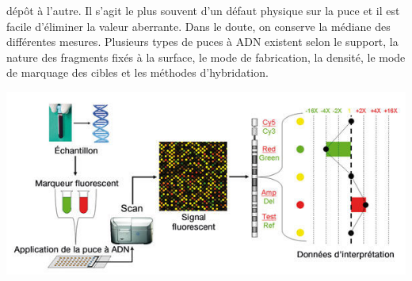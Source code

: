 \documentclass[a4paper,10pt]{article}
\begin{document}
  dépôt à l'autre. Il s'agit le plus souvent d'un défaut physique sur la puce et il est facile d'éliminer la valeur aberrante.
  Dans le doute, on conserve la médiane des différentes mesures. 
  \newline
  Plusieurs  types  de  puces  à  ADN  
existent selon le support, la nature des fragments fixés à la surface, le mode de fabrication, la 
densité, le mode de marquage des cibles et les méthodes d’hybridation.
\begin{center}
 \includegraphics[scale=0.5]{./image/principe.jpg}
\end{center}
\end{document}
